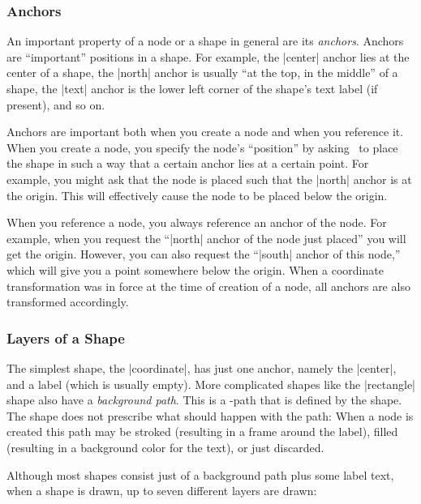\subsubsection{Anchors}

An important property of a node or a shape in general are its
\emph{anchors}. Anchors are ``important'' positions in a shape. For
example, the |center| anchor lies at the center of a shape, the
|north| anchor is usually ``at the top, in the middle'' of a shape,
the |text| anchor is the lower left corner of the shape's text label
(if present), and so on.

Anchors are important both when you create a node and when you
reference it. When you create a node, you specify the node's
``position'' by asking \pgfname\ to place the shape in such a way that
a certain anchor lies at a certain point. For example, you might ask
that the node is placed such that the |north| anchor is at the
origin. This will effectively cause the node to be placed below the
origin.

When you reference a node, you always reference an anchor of the
node. For example, when you request the ``|north| anchor of the node
just placed'' you will get the origin. However, you can also request
the ``|south| anchor of this node,'' which will give you a point
somewhere below the origin. When a coordinate transformation was in
force at the time of creation of a node, all anchors are also
transformed accordingly.

\subsubsection{Layers of a Shape}

The simplest shape, the |coordinate|, has just one anchor, namely the
|center|, and a label (which is usually empty). More complicated
shapes like the |rectangle| shape also have a \emph{background
  path}. This is a \pgfname-path that is defined by the shape. The
shape does not prescribe what should happen with the path: When a node
is created this path may be stroked (resulting in a frame around the
label), filled (resulting in a background color for the text), or just
discarded.

Although most shapes consist just of a background path plus some label
text, when a shape is drawn, up to seven different layers are drawn:

